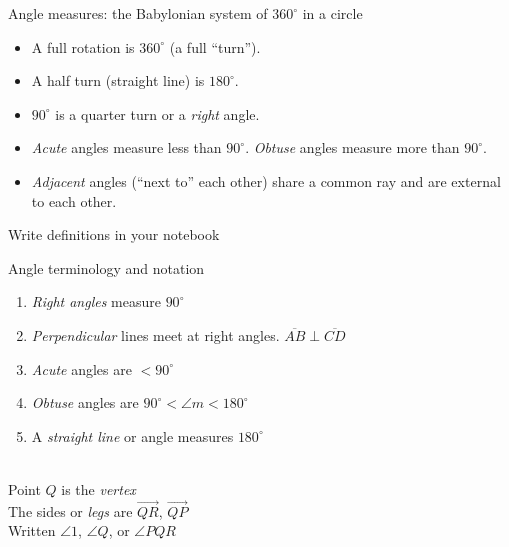 \begin{frame}{Angle measures: the Babylonian system of $360^\circ$ in a circle}
    \begin{itemize}
      \item A full rotation is $360^\circ$ (a full ``turn'').
      \item A half turn (straight line) is $180^\circ$.
      \item $90^\circ$ is a quarter turn or a \emph{right} angle.
      \item \emph{Acute} angles measure less than $90^\circ$. \emph{Obtuse} angles measure more than $90^\circ$.
      \item \emph{Adjacent} angles (``next to'' each other) share a common ray and are external to each other.
    \end{itemize}
  \begin{center}
    \end{center}
\end{frame}

\begin{frame}{Write definitions in your notebook}
  \begin{block}{Angle terminology and notation}
  \begin{enumerate}
      \item \emph{Right angles} measure $90^\circ$
      \item \emph{Perpendicular} lines meet at right angles. $\overline{AB} \perp \overline{CD}$
      \item \emph{Acute} angles are $< 90^\circ$
      \item \emph{Obtuse} angles are $90^\circ < \angle m < 180^\circ$
      \item A \emph{straight line} or angle measures $180^\circ$
  \end{enumerate}
  \end{block}
  \begin{multicols}{2}
   \\
  Point $Q$ is the \emph{vertex} \\[0.25cm]
  The sides or \emph{legs} are $\overrightarrow{QR}$, $\overrightarrow{QP}$ \\[0.25cm]
  Written $\angle 1$, $\angle Q$, or $\angle PQR$
\end{multicols}

\end{frame}

